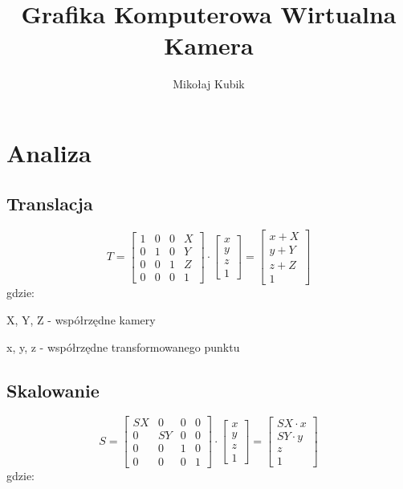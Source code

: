 \documentclass[11pt]{article}
\title{Grafika Komputerowa Wirtualna Kamera}
\author{Mikołaj Kubik}
\begin{document}
\maketitle
\section{Analiza}
\subsection{Translacja}
\begin{equation}
    T =
    \begin{bmatrix}
        1 & 0 & 0 & X\\
        0 & 1 & 0 & Y\\
        0 & 0 & 1 & Z\\
        0 & 0 & 0 & 1
    \end{bmatrix}
    \cdot
    \begin{bmatrix}
        x\\
        y\\
        z\\
        1
    \end{bmatrix}
    =
    \begin{bmatrix}
        x + X\\
        y + Y\\
        z + Z\\
        1
    \end{bmatrix}
\end{equation}
gdzie:

X, Y, Z - współrzędne kamery

x, y, z - współrzędne transformowanego punktu

\subsection{Skalowanie}
\begin{equation}
    S =
    \begin{bmatrix}
        SX & 0 & 0 & 0\\
        0 & SY & 0 & 0\\
        0 & 0 & 1 & 0\\
        0 & 0 & 0 & 1
    \end{bmatrix}
    \cdot
    \begin{bmatrix}
        x\\
        y\\
        z\\
        1
    \end{bmatrix}
    =
    \begin{bmatrix}
        SX \cdot x\\
        SY \cdot y\\
        z\\
        1
    \end{bmatrix}
\end{equation}
gdzie:
\end{document}
